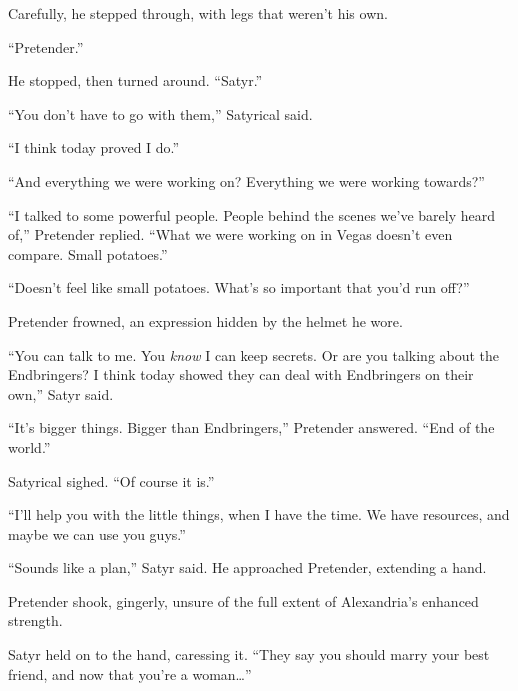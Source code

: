 Carefully, he stepped through, with legs that weren't his own.



``Pretender.''



He stopped, then turned around.  ``Satyr.''



``You don't have to go with them,'' Satyrical said.



``I think today proved I do.''



``And everything we were working on?  Everything we were working towards?''



``I talked to some powerful people.  People behind the scenes we've barely heard of,'' Pretender replied.  ``What we were working on in Vegas doesn't even compare.  Small potatoes.''



``Doesn't feel like small potatoes.  What's so important that you'd run off?''



Pretender frowned, an expression hidden by the helmet he wore.



``You can talk to me.  You \emph{know} I can keep secrets.  Or are you talking about the Endbringers?  I think today showed they can deal with Endbringers on their own,'' Satyr said.



``It's bigger things.  Bigger than Endbringers,'' Pretender answered.  ``End of the world.''



Satyrical sighed.  ``Of course it is.''



``I'll help you with the little things, when I have the time.  We have resources, and maybe we can use you guys.''



``Sounds like a plan,'' Satyr said.  He approached Pretender, extending a hand.



Pretender shook, gingerly, unsure of the full extent of Alexandria's enhanced strength.



Satyr held on to the hand, caressing it.  ``They say you should marry your best friend, and now that you're a woman\ldots''



